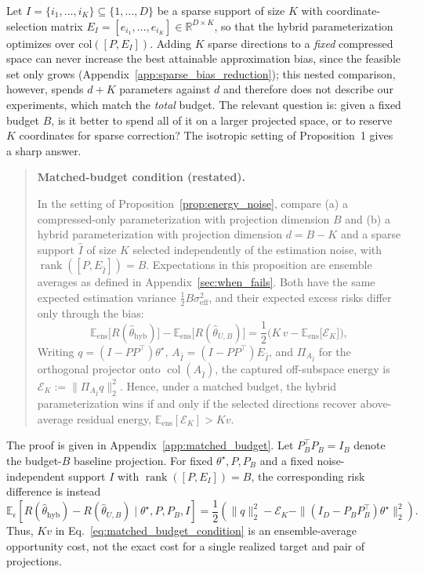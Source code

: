 Let $I=\{i_1,\ldots,i_K\}\subseteq\{1,\ldots,D\}$ be a sparse support of size $K$ with coordinate-selection matrix $E_I=[e_{i_1},\ldots,e_{i_K}]\in\mathbb{R}^{D\times K}$, so that the hybrid parameterization optimizes over $\mathrm{col}([P,E_I])$.
Adding $K$ sparse directions to a \emph{fixed} compressed space can never increase the best attainable approximation bias, since the feasible set only grows (Appendix~\ref{app:sparse_bias_reduction}); this nested comparison, however, spends $d+K$ parameters against $d$ and therefore does not describe our experiments, which match the \emph{total} budget.
The relevant question is: given a fixed budget $B$, is it better to spend all of it on a larger projected space, or to reserve $K$ coordinates for sparse correction?
The isotropic setting of Proposition~1 gives a sharp answer.

\begin{quote}\textbf{Matched-budget condition (restated).}

In the setting of Proposition~\ref{prop:energy_noise}, compare (a) a compressed-only parameterization with projection dimension $B$ and (b) a hybrid parameterization with projection dimension $d=B-K$ and a sparse support $\hat{I}$ of size $K$ selected independently of the estimation noise, with $\operatorname{rank}([P,E_{\hat{I}}])=B$.
Expectations in this proposition are ensemble averages as defined in Appendix~\ref{sec:when_fails}.
Both have the same expected estimation variance $\frac{1}{2}B\sigma_{\mathrm{eff}}^2$, and their expected excess risks differ only through the bias:
\begin{equation}
\mathbb E_{\mathrm{ens}}\big[R(\hat{\theta}_{\mathrm{hyb}})\big]
-
\mathbb E_{\mathrm{ens}}\big[R(\hat{\theta}_{U,B})\big]
=
\frac{1}{2}\Big(K\,v-\mathbb E_{\mathrm{ens}}\big[\mathcal{E}_K\big]\Big),
\label{eq:matched_budget_condition}
\end{equation}
Writing $q=(I-PP^\top)\theta^\star$, $A_{\hat I}=(I-PP^\top)E_{\hat I}$, and $\Pi_{A_{\hat I}}$ for the orthogonal projector onto $\operatorname{col}(A_{\hat I})$, the captured off-subspace energy is
$\mathcal E_K:=\|\Pi_{A_{\hat I}}q\|_2^2$.
Hence, under a matched budget, the hybrid parameterization wins if and only if the selected directions recover above-average residual energy, $\mathbb E_{\mathrm{ens}}[\mathcal{E}_K]>Kv$.
\end{quote}
The proof is given in Appendix~\ref{app:matched_budget}.
Let $P_B^\top P_B=I_B$ denote the budget-$B$ baseline projection. For fixed $\theta^\star,P,P_B$ and a fixed noise-independent support $I$ with $\operatorname{rank}([P,E_I])=B$, the corresponding risk difference is instead
\begin{equation}
\mathbb E_\epsilon\!\left[R(\hat\theta_{\mathrm{hyb}})-R(\hat\theta_{U,B})\mid\theta^\star,P,P_B,I\right]
=\frac12\left(\|q\|_2^2-\mathcal E_K-\|(I_D-P_BP_B^\top)\theta^\star\|_2^2\right).
\label{eq:fixed_matched_budget_condition}
\end{equation}
Thus, $Kv$ in Eq.~\eqref{eq:matched_budget_condition} is an ensemble-average opportunity cost, not the exact cost for a single realized target and pair of projections.

